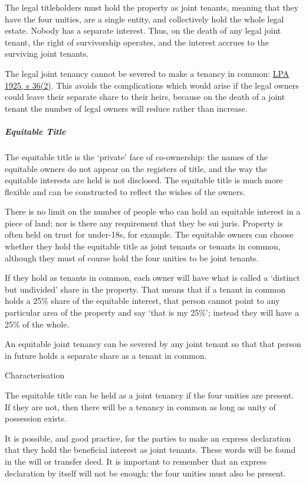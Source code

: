 \documentclass[
]{article}
\begin{document}
The legal titleholders must hold the property as joint tenants, meaning
that they have the four unities, are a single entity, and collectively
hold the whole legal estate. Nobody has a separate interest. Thus, on
the death of any legal joint tenant, the right of survivorship operates,
and the interest accrues to the surviving joint tenants.

The legal joint tenancy cannot be severed to make a tenancy in common:
\href{https://www.legislation.gov.uk/ukpga/Geo5/15-16/20/section/36}{LPA
1925, s 36(2)}. This avoids the complications which would arise if the
legal owners could leave their separate share to their heirs, because on
the death of a joint tenant the number of legal owners will reduce
rather than increase.

\hypertarget{equitable-title}{%
\subparagraph{Equitable Title}\label{equitable-title}}

The equitable title is the `private' face of co-ownership: the names of
the equitable owners do not appear on the registers of title, and the
way the equitable interests are held is not disclosed. The equitable
title is much more flexible and can be constructed to reflect the wishes
of the owners.

There is no limit on the number of people who can hold an equitable
interest in a piece of land; nor is there any requirement that they be
sui juris. Property is often held on trust for under-18s, for example.
The equitable owners can choose whether they hold the equitable title as
joint tenants or tenants in common, although they must of course hold
the four unities to be joint tenants.

If they hold as tenants in common, each owner will have what is called a
`distinct but undivided' share in the property. That means that if a
tenant in common holds a 25\% share of the equitable interest, that
person cannot point to any particular area of the property and say `that
is my 25\%'; instead they will have a 25\% of the whole.

An equitable joint tenancy can be severed by any joint tenant so that
that person in future holds a separate share as a tenant in common.

Characterisation

The equitable title can be held as a joint tenancy if the four unities
are present. If they are not, then there will be a tenancy in common as
long as unity of possession exists.

It is possible, and good practice, for the parties to make an express
declaration that they hold the beneficial interest as joint tenants.
These words will be found in the will or transfer deed. It is important
to remember that an express declaration by itself will not be enough:
the four unities must also be present.
\end{document}
